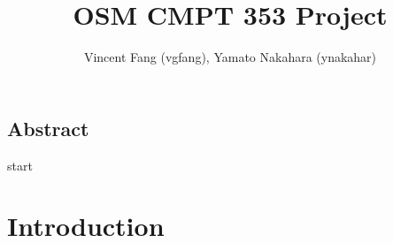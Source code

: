 \documentclass[9pt]{article}
\title{
	OSM CMPT 353 Project
	\large }
\author{Vincent Fang (vgfang), Yamato Nakahara (ynakahar)}
\begin{document}
\maketitle
\subsection*{Abstract}
start
\section*{Introduction}
\end{document}
